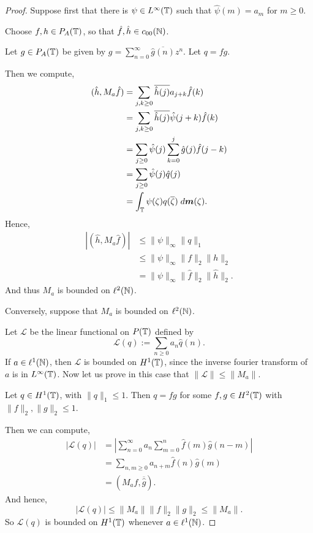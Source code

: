 \documentclass{unswmaths}
\begin{document}
\begin{proof}
    Suppose first that there is $\psi \in L^\infty(\mathbb{T})$
    such that $\hat{\psi}(m) = a_m$ for $m\geq 0$. 
    
    Choose $f,h \in P_A(\mathbb{T})$, so that $\hat{f},\hat{h} \in c_{00}(\mathbb{N})$.
    
    Let $g \in P_A(\mathbb{T})$ be given by $g = \sum_{n=0}^\infty \overline{\hat{g}(n)}z^n$.
    Let $q = fg$.
    
    Then we compute,
    \begin{align*}
        (\hat{h},M_a\hat{f}) &= \sum_{j,k \geq 0} \overline{\hat{h}(j)}a_{j+k}\hat{f}(k)\\
        &= \sum_{j,k\geq 0} \overline{\hat{h}(j)}\hat{\psi}(j+k)\hat{f}(k)\\
        &= \sum_{j \geq 0} \hat{\psi}(j) \sum_{k=0}^j \hat{g}(j)\hat{f}(j-k)\\
        &= \sum_{j \geq 0} \hat{\psi}(j) \hat{q}(j)\\
        &= \int_{\mathbb{T}} \psi(\zeta) q(\overline{\zeta}) \;d\boldsymbol{m}(\zeta).
    \end{align*}
    Hence,
    \begin{align*}
        |(\hat{h},M_a\hat{f})| &\leq \|\psi\|_{\infty} \|q\|_1\\
                               &\leq \|\psi\|_\infty \|f\|_2 \|h\|_2\\
                               &= \|\psi\|_\infty \|\hat{f}\|_2\|\hat{h}\|_2.
    \end{align*}
    And thus $M_a$ is bounded on $\ell^2(\mathbb{N})$.
    
    Conversely, suppose that $M_a$ is bounded on $\ell^2(\mathbb{N})$. 
    
    Let $\mathcal{L}$ be the linear functional on $P(\mathbb{T})$ defined by
    \begin{equation*}
        \mathcal{L}(q) := \sum_{n\geq 0} a_n \hat{q}(n).
    \end{equation*}
    If $a \in \ell^1(\mathbb{N})$, then $\mathcal{L}$ is bounded on $H^1(\mathbb{T})$,
    since the inverse fourier transform of $a$ is in $L^\infty(\mathbb{T})$. 
    Now let us prove in this case that $\|\mathcal{L}\| \leq \|M_a\|$. 
    
    Let $q \in H^1(\mathbb{T})$, with $\|q\|_1 \leq 1$. Then $q = fg$
    for some $f,g \in H^2(\mathbb{T})$ with $\|f\|_2,\|g\|_2 \leq 1$. 
    
    Then we can compute,
    \begin{align*} 
        |\mathcal{L}(q)| &= \left|\sum_{n=0}^\infty a_n \sum_{m=0}^n \hat{f}(m)\hat{g}(n-m)\right|\\
        &= \sum_{n,m\geq 0} a_{n+m} \hat{f}(n) \hat{g}(m)\\
        &= (M_a \hat{f},\overline{\hat{g}}). 
    \end{align*}
    And hence,
    \begin{equation*}
        |\mathcal{L}(q)| \leq \|M_a\|\|f\|_2\|g\|_2 \leq \|M_a\|.
    \end{equation*}
    So $\mathcal{L}(q)$ is bounded on $H^1(\mathbb{T})$ whenever $a \in \ell^1(\mathbb{N})$. 
    

\end{proof}
\end{document}
